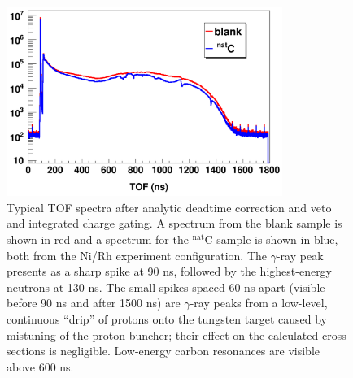 \begin{figure}[tb]
    \centering
    \includegraphics[width=0.8\textwidth]{figures/exampleTOFSpectrum.png}
    \caption[Typical time-of-flight spectrum after timing and deadtime corrections]
    {
        Typical TOF spectra after analytic deadtime correction and
        veto and integrated charge gating. A spectrum from the blank sample is shown in
        red and a spectrum for the $^{\text{nat}}$C sample is shown in blue, both from the Ni/Rh 
        experiment configuration.
        The $\gamma$-ray peak presents as a sharp spike at 90 ns, followed by
        the highest-energy neutrons at 130 ns. The small spikes spaced 60 ns
        apart (visible before 90 ns and after 1500
        ns) are $\gamma$-ray peaks from a low-level, continuous ``drip'' 
        of protons onto the tungsten target caused by mistuning of the proton 
        buncher; their effect on the calculated cross sections is negligible. Low-energy carbon
        resonances are visible above 600 ns.
    }
    \label{ExampleTOFSpectrum}
\end{figure}

